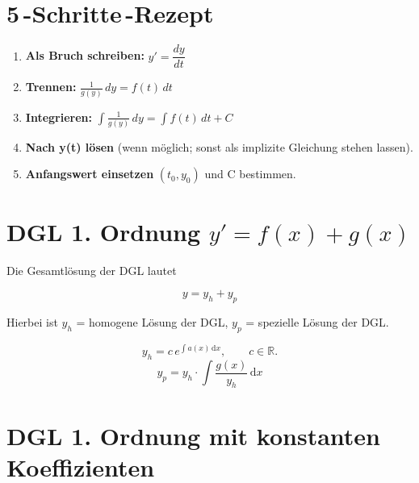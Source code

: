 \documentclass[a4paper,11pt,oneside,open=any,parskip=half, DIV=15]{scrreprt}
\begin{document}
   \section*{5\,-Schritte\,-Rezept}
      \begin{importantbox}
         \begin{enumerate}[label=\textbf{\arabic*)},itemsep=2pt,topsep=4pt]   %
            \item \textbf{Als Bruch schreiben:} \(y'=\dfrac{dy}{dt}\)
            \item \textbf{Trennen:} \(\displaystyle \frac{1}{g(y)}\,dy=f(t)\,dt\)
            \item \textbf{Integrieren:} \(\displaystyle \int \frac{1}{g(y)}\,dy=\int f(t)\,dt + C\)
            \item \textbf{Nach y(t) lösen} (wenn möglich; sonst als implizite Gleichung stehen lassen).
            \item \textbf{Anfangswert einsetzen} \((t_0,y_0)\) und C bestimmen.
         \end{enumerate}
      \end{importantbox}


\section[DGL 1. Ordnung y' = f(x)+g(x)]{DGL 1. Ordnung \texorpdfstring{$y' = f(x)+g(x)$}{y' = f(x)+g(x)}}

   Die Gesamtlösung der DGL lautet
   \begin{importantbox}
      \[ 
         y = y_h + y_p 
      \]
   \end{importantbox}   


   Hierbei ist \( y_h \) = homogene Lösung der DGL,
   \( y_p \) = spezielle Lösung der DGL.\@

   \begin{importantbox}
      \[
         y_h = c\,e^{\int a(x) \, \mathrm{d}x}, \qquad c \in \mathbb{R}.
         \]
      \[
         y_p = y_h \cdot \int \frac{g(x)}{y_h}\,\mathrm{d}x
      \] 
   \end{importantbox}

\newpage
\section{DGL 1. Ordnung mit konstanten Koeffizienten}
\end{document}
